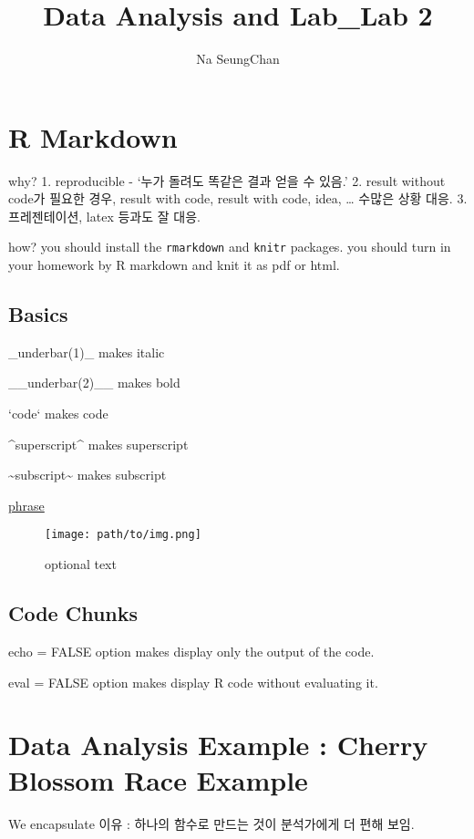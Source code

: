 \documentclass[
]{article}
\title{Data Analysis and Lab\_Lab 2}
\author{Na SeungChan}
\date{}
\begin{document}
\maketitle

\hypertarget{r-markdown}{%
\section{R Markdown}\label{r-markdown}}

why? 1. reproducible - `누가 돌려도 똑같은 결과 얻을 수 있음.' 2. result
without code가 필요한 경우, result with code, result with code, idea,
\ldots{} 수많은 상황 대응. 3. 프레젠테이션, latex 등과도 잘 대응.

how? you should install the \texttt{rmarkdown} and \texttt{knitr}
packages. you should turn in your homework by R markdown and knit it as
pdf or html.

\hypertarget{basics}{%
\subsection{Basics}\label{basics}}

\_underbar(1)\_ makes italic

\_\_underbar(2)\_\_ makes bold

`code` makes code

\^{}superscript\^{} makes superscript

\textasciitilde subscript\textasciitilde{} makes subscript

\href{link}{phrase}

\begin{figure}
\centering
\texttt{[image: path/to/img.png]}
\caption{optional text}
\end{figure}

\hypertarget{code-chunks}{%
\subsection{Code Chunks}\label{code-chunks}}

echo = FALSE option makes display only the output of the code.

eval = FALSE option makes display R code without evaluating it.

\hypertarget{data-analysis-example-cherry-blossom-race-example}{%
\section{Data Analysis Example : Cherry Blossom Race
Example}\label{data-analysis-example-cherry-blossom-race-example}}

We encapsulate 이유 : 하나의 함수로 만드는 것이 분석가에게 더 편해 보임.
\end{document}
